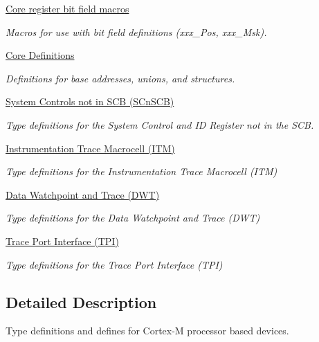 \begin{DoxyCompactItemize}
\hyperlink{group___c_m_s_i_s__core__bitfield}{Core register bit field macros}
\begin{DoxyCompactList}\small\item\em Macros for use with bit field definitions (xxx\-\_\-\-Pos, xxx\-\_\-\-Msk). \end{DoxyCompactList}\item 
\hyperlink{group___c_m_s_i_s__core__base}{Core Definitions}
\begin{DoxyCompactList}\small\item\em Definitions for base addresses, unions, and structures. \end{DoxyCompactList}\item 
\hyperlink{group___c_m_s_i_s___s_cn_s_c_b}{System Controls not in S\-C\-B (\-S\-Cn\-S\-C\-B)}
\begin{DoxyCompactList}\small\item\em Type definitions for the System Control and I\-D Register not in the S\-C\-B. \end{DoxyCompactList}\item 
\hyperlink{group___c_m_s_i_s___i_t_m}{Instrumentation Trace Macrocell (\-I\-T\-M)}
\begin{DoxyCompactList}\small\item\em Type definitions for the Instrumentation Trace Macrocell (I\-T\-M) \end{DoxyCompactList}\item 
\hyperlink{group___c_m_s_i_s___d_w_t}{Data Watchpoint and Trace (\-D\-W\-T)}
\begin{DoxyCompactList}\small\item\em Type definitions for the Data Watchpoint and Trace (D\-W\-T) \end{DoxyCompactList}\item 
\hyperlink{group___c_m_s_i_s___t_p_i}{Trace Port Interface (\-T\-P\-I)}
\begin{DoxyCompactList}\small\item\em Type definitions for the Trace Port Interface (T\-P\-I) \end{DoxyCompactList}\end{DoxyCompactItemize}


\subsection{Detailed Description}
Type definitions and defines for Cortex-\/\-M processor based devices. 